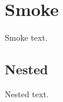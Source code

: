 \documentclass{article}
\begin{document}
\section{Smoke}
Smoke text.
\subsection{Nested}
Nested text.
\end{document}
